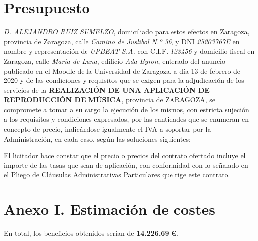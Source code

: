 \documentclass{article}
\begin{document}
\section{Presupuesto}
\textit{D. ALEJANDRO RUIZ SUMELZO}, domiciliado para estos efectos en Zaragoza, provincia de Zaragoza, calle \textit{Camino de Juslibol N.º 36}, y DNI \textit{25203767E} en nombre y representación de \textit{UPBEAT S.A.} con C.I.F. \textit{123456} y domicilio fiscal en Zaragoza, calle \textit{María de Luna}, edificio \textit{Ada Byron}, enterado del anuncio publicado en el Moodle de la Universidad de Zaragoza, a día 13 de febrero de 2020 y de las condiciones y requisitos que se exigen para la adjudicación de los servicios de la \textbf{REALIZACIÓN DE UNA APLICACIÓN DE REPRODUCCIÓN DE MÚSICA}, provincia de ZARAGOZA, se compromete a tomar a su cargo la ejecución de los mismos, con estricta sujeción a los requisitos y condiciones expresados, por las cantidades que se enumeran en concepto de precio, indicándose igualmente el IVA a soportar por la Administración, en cada caso, según las soluciones siguientes:

\begin{figure}[H]
\end{figure}

El licitador hace constar que el precio o precios del contrato ofertado incluye el importe de las tasas que sean de aplicación, con conformidad con lo señalado en el Pliego de Cláusulas Administrativas Particulares que rige este contrato. 
\newpage
\section*{Anexo I. Estimación de costes}
\begin{figure}[H]
	\hspace*{-3.5cm}
\end{figure}

En total, los beneficios obtenidos serían de \textbf{14.226,69 \euro}.
\end{document}
